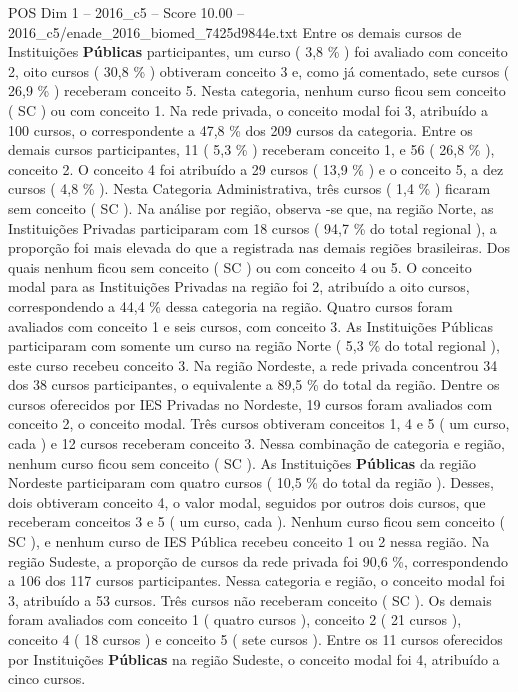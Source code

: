 \begin{textsample}{POS Dim 1 – 2016\_c5 – Score 10.00 – 2016\_c5/enade\_2016\_biomed\_7425d9844e.txt}
Entre os demais cursos de Instituições \textbf{Públicas} participantes, um curso ( 3,8 \% ) foi avaliado com conceito 2, oito cursos ( 30,8 \% ) obtiveram conceito 3 e, como já comentado, sete cursos ( 26,9 \% ) receberam conceito 5.
Nesta categoria, nenhum curso ficou sem conceito ( SC ) ou com conceito 1.
Na rede privada, o conceito modal foi 3, atribuído a 100 cursos, o correspondente a 47,8 \% dos 209 cursos da categoria.
Entre os demais cursos participantes, 11 ( 5,3 \% ) receberam conceito 1, e 56 ( 26,8 \% ), conceito 2.
O conceito 4 foi atribuído a 29 cursos ( 13,9 \% ) e o conceito 5, a dez cursos ( 4,8 \% ).
Nesta Categoria Administrativa, três cursos ( 1,4 \% ) ficaram sem conceito ( SC ).
Na análise por região, observa -se que, na região Norte, as Instituições Privadas participaram com 18 cursos ( 94,7 \% do total regional ), a proporção foi mais elevada do que a registrada nas demais regiões brasileiras.
Dos quais nenhum ficou sem conceito ( SC ) ou com conceito 4 ou 5.
O conceito modal para as Instituições Privadas na região foi 2, atribuído a oito cursos, correspondendo a 44,4 \% dessa categoria na região.
Quatro cursos foram avaliados com conceito 1 e seis cursos, com conceito 3.
As Instituições Públicas participaram com somente um curso na região Norte ( 5,3 \% do total regional ), este curso recebeu conceito 3.
Na região Nordeste, a rede privada concentrou 34 dos 38 cursos participantes, o equivalente a 89,5 \% do total da região.
Dentre os cursos oferecidos por IES Privadas no Nordeste, 19 cursos foram avaliados com conceito 2, o conceito modal.
Três cursos obtiveram conceitos 1, 4 e 5 ( um curso, cada ) e 12 cursos receberam conceito 3.
Nessa combinação de categoria e região, nenhum curso ficou sem conceito ( SC ).
As Instituições \textbf{Públicas} da região Nordeste participaram com quatro cursos ( 10,5 \% do total da região ).
Desses, dois obtiveram conceito 4, o valor modal, seguidos por outros dois cursos, que receberam conceitos 3 e 5 ( um curso, cada ).
Nenhum curso ficou sem conceito ( SC ), e nenhum curso de IES Pública recebeu conceito 1 ou 2 nessa região.
Na região Sudeste, a proporção de cursos da rede privada foi 90,6 \%, correspondendo a 106 dos 117 cursos participantes.
Nessa categoria e região, o conceito modal foi 3, atribuído a 53 cursos.
Três cursos não receberam conceito ( SC ).
Os demais foram avaliados com conceito 1 ( quatro cursos ), conceito 2 ( 21 cursos ), conceito 4 ( 18 cursos ) e conceito 5 ( sete cursos ).
Entre os 11 cursos oferecidos por Instituições \textbf{Públicas} na região Sudeste, o conceito modal foi 4, atribuído a cinco cursos.

\end{textsample}
